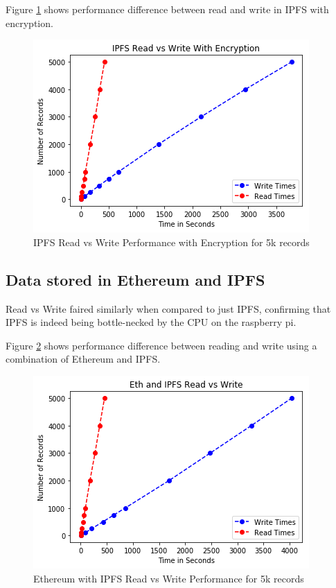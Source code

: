 \documentclass[11pt,openright]{report}
\begin{document}
Figure \ref{fig:graph_ipfs_readvwrite_wencr} shows performance difference between read and write in IPFS with encryption.
\begin{figure}
    \centering
    \includegraphics[scale=1]{results/graphs/IPFS_Read_v_Write_Encr.png}
    \caption{IPFS Read vs Write Performance with Encryption for 5k records}
    \label{fig:graph_ipfs_readvwrite_wencr}
\end{figure}

\subsection{Data stored in Ethereum and IPFS}
Read vs Write faired similarly when compared to just IPFS, confirming that IPFS is indeed being bottle-necked by the CPU on the raspberry pi.

Figure \ref{fig:graph_eth_ipfs_readvwrite} shows performance difference between reading and write using a combination of Ethereum and IPFS.

\begin{figure}
    \centering
    \includegraphics[scale=1]{results/graphs/Eth_IPFS_Read_v_Write.png}
    \caption{Ethereum with IPFS Read vs Write Performance for 5k records}
    \label{fig:graph_eth_ipfs_readvwrite}
\end{figure}
\end{document}
